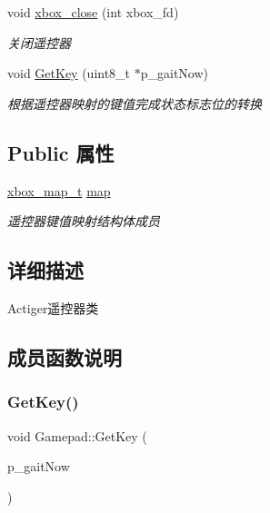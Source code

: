\begin{DoxyCompactItemize}
void \hyperlink{classquadruped_1_1Gamepad_aedbe5a93bd4af4b3fb22137ae1549612}{xbox\+\_\+close} (int xbox\+\_\+fd)
\begin{DoxyCompactList}\small\item\em 关闭遥控器 \end{DoxyCompactList}\item 
void \hyperlink{classquadruped_1_1Gamepad_a2231f881a5ce074c07520781b01bf364}{Get\+Key} (uint8\+\_\+t $\ast$p\+\_\+gait\+Now)
\begin{DoxyCompactList}\small\item\em 根据遥控器映射的键值完成状态标志位的转换 \end{DoxyCompactList}\end{DoxyCompactItemize}
\subsection*{Public 属性}
\begin{DoxyCompactItemize}
\item 
\mbox{\label{classquadruped_1_1Gamepad_a1c1056b8a615214ad8e4d4e03ffb1962}} 
\hyperlink{structxbox__map__t}{xbox\+\_\+map\+\_\+t} \hyperlink{classquadruped_1_1Gamepad_a1c1056b8a615214ad8e4d4e03ffb1962}{map}
\begin{DoxyCompactList}\small\item\em 遥控器键值映射结构体成员 \end{DoxyCompactList}\end{DoxyCompactItemize}


\subsection{详细描述}
Actiger遥控器类 

\subsection{成员函数说明}
\mbox{\label{classquadruped_1_1Gamepad_a2231f881a5ce074c07520781b01bf364}} 
\subsubsection{\texorpdfstring{Get\+Key()}{GetKey()}}
{\footnotesize\ttfamily void Gamepad\+::\+Get\+Key (\begin{DoxyParamCaption}\item[{uint8\+\_\+t $\ast$}]{p\+\_\+gait\+Now }\end{DoxyParamCaption})}



